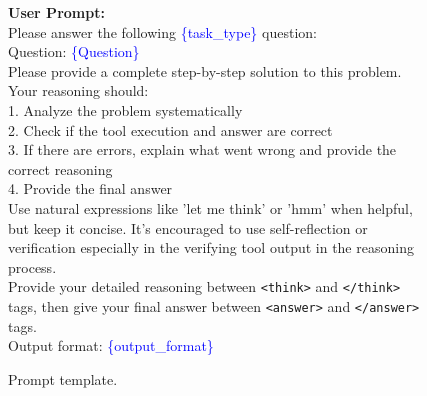 \begin{figure}[htbp]
\begin{tcolorbox}
\medskip
\textbf{User Prompt:} \\[2pt]
Please answer the following \textcolor{blue}{\{task\_type\}} question: \\
Question: \textcolor{blue}{\{Question\}} \\
Please provide a complete step-by-step solution to this problem. Your reasoning should: \\
1. Analyze the problem systematically \\
2. Check if the tool execution and answer are correct \\
3. If there are errors, explain what went wrong and provide the correct reasoning \\
4. Provide the final answer \\
Use natural expressions like 'let me think' or 'hmm' when helpful, but keep it concise. It’s encouraged to use self-reflection or verification especially in the verifying tool output in the reasoning process. \\
Provide your detailed reasoning between \texttt{<think>} and \texttt{</think>} tags, then give your final answer between \texttt{<answer>} and \texttt{</answer>} tags. \\
Output format: \textcolor{blue}{\{output\_format\}}
\end{tcolorbox}
\caption{Prompt template.}
\label{fig:prompt}
\end{figure}